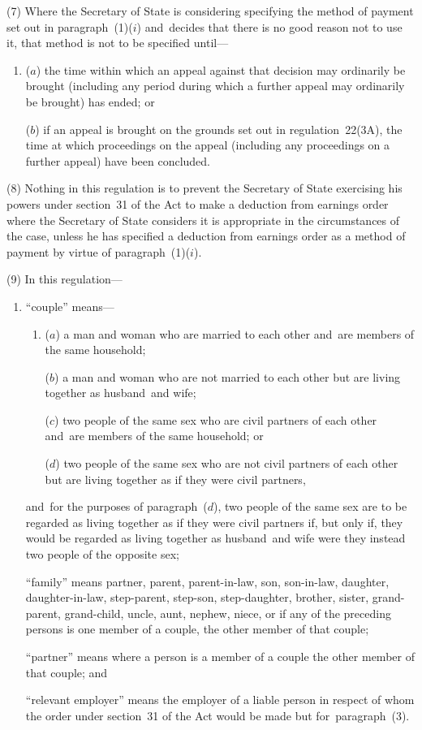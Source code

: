 \documentclass[12pt,a4paper]{article}
\begin{document}
(7) Where the Secretary of State is considering specifying the method of payment set out in paragraph~(1)($i$)  and~decides that there is no good reason not to use it, that method is not to be specified until—
\begin{enumerate}\item[]
($a$) the time within which an appeal against that decision may ordinarily be brought (including any period during which a further appeal may ordinarily be brought) has ended; or

($b$) if an appeal is brought on the grounds set out in regulation~22(3A), the time at which proceedings on the appeal (including any proceedings on a further appeal) have been concluded.
\end{enumerate}

(8) Nothing in this regulation is to prevent the Secretary of State exercising his powers under section~31 of the Act to make a deduction from earnings order where the Secretary of State considers it is appropriate in the circumstances of the case, unless he has specified a deduction from earnings order as a method of payment by virtue of paragraph~(1)($i$).

(9) In this regulation—
\begin{enumerate}\item[]
“couple” means—
\begin{enumerate}\item[]
($a$) 
a man and woman who are married to each other and~are members of the same household;

($b$) 
a man and woman who are not married to each other but are living together as husband~and wife;

($c$) 
two people of the same sex who are civil partners of each other and~are members of the same household; or

($d$) 
two people of the same sex who are not civil partners of each other but are living together as if they were civil partners,
\end{enumerate}
and~for the purposes of paragraph~($d$), two people of the same sex are to be regarded as living together as if they were civil partners if, but only if, they would be regarded as living together as husband~and wife were they instead two people of the opposite sex;

“family” means partner, parent, parent-in-law, son, son-in-law, daughter, daughter-in-law, step-parent, step-son, step-daughter, brother, sister, grand-parent, grand-child, uncle, aunt, nephew, niece, or if any of the preceding persons is one member of a couple, the other member of that couple;

“partner” means where a person is a member of a couple the other member of that couple; and

“relevant employer” means the employer of a liable person in respect of whom the order under section~31 of the Act would be made but for~paragraph~(3).
\end{enumerate}
\end{document}
